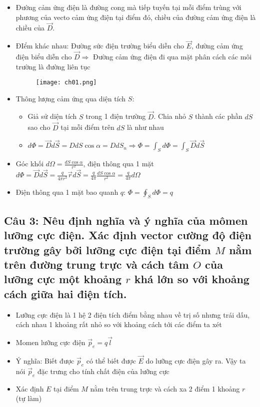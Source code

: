 \begin{itemize}
  \item Đường cảm ứng điện là đường cong mà tiếp tuyến tại mỗi điểm trùng với phương của vecto cảm ứng điện tại điểm đó, chiều của đường cảm ứng điện là chiều của $\vec{D}$.
  \item ĐIểm khác nhau: Đường sức điện trường biểu diễn cho $\vec{E}$, đường cảm ứng điện biểu diễn cho $\vec{D} \Rightarrow$ Đường cảm ứng điện đi qua mặt phân cách các môi trường là đường liên tục
\begin{figure}[h]
  \centering
  \texttt{[image: ch01.png]}
\end{figure}
  \item Thông lượng cảm ứng qua diện tích $S$:
  \begin{itemize}
    \item Giả sử diện tích $S$ trong 1 điện trường $\vec{D}$. Chia nhỏ $S$ thành các phần $dS$ sao cho $\vec{D}$ tại mỗi điểm trên $dS$ là như nhau
    \item $d\Phi = \vec{D}d\vec{S} = DdS\cos\alpha = DdS_n \Rightarrow \Phi = \int_S d\Phi = \int_S \vec{D}d\vec{S}$
  \end{itemize}
  \item Góc khối $d\Omega = \frac{dS\cos\alpha}{r^2}$, điện thông qua 1 mặt $d\Phi = \vec{D}d\vec{S} = \frac{q}{4\pi r^3} \vec{r}d\vec{S} = \frac{q}{4\pi} \frac{dS\cos\alpha}{r^2} = \frac{q}{4\pi} d\Omega$
  \item Điện thông qua 1 mặt bao quanh $q$: $\Phi = \oint_S d\Phi = q$
\end{itemize}

\subsection[Câu 3]{Câu 3: Nêu định nghĩa và ý nghĩa của mômen lưỡng cực điện. Xác định vector cường độ điện trường gây bởi lưỡng cực điện tại điểm $M$ nằm trên đường trung trực và cách tâm $O$ của lưỡng cực một khoảng $r$ khá lớn so với khoảng cách giữa hai điện tích.}

\begin{itemize}
  \item Lưỡng cực điện là 1 hệ 2 điện tích điểm bằng nhau về trị số nhưng trái dấu, cách nhau 1 khoảng rất nhỏ so với khoảng cách tới các điểm ta xét
  \item Momen lưỡng cực điện $\vec{p}_e = q\vec{l}$ 
  \item Ý nghĩa: Biết được $\vec{p}_e$ có thể biết được $\vec{E}$ do lưỡng cực điện gây ra. Vậy ta nói $\vec{p}_e$ đặc trưng cho tính chất điện của lưỡng cực
  \item Xác định $E$ tại điểm $M$ nằm trên trung trực và cách xa 2 điểm 1 khoảng $r$ (tự làm)
\end{itemize}

